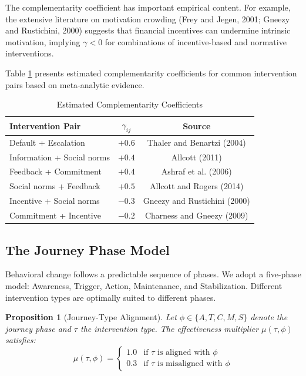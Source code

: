 \documentclass[12pt,a4paper]{article}
\newtheorem{proposition}{Proposition}
\begin{document}
The complementarity coefficient has important empirical content. For example, the extensive literature on motivation crowding (Frey and Jegen, 2001; Gneezy and Rustichini, 2000) suggests that financial incentives can undermine intrinsic motivation, implying $\gamma < 0$ for combinations of incentive-based and normative interventions.

Table \ref{tab:complementarity} presents estimated complementarity coefficients for common intervention pairs based on meta-analytic evidence.

\begin{table}[H]
\centering
\caption{Estimated Complementarity Coefficients}
\label{tab:complementarity}
\small
\renewcommand{\arraystretch}{1.2}
\begin{tabular}{@{}lcc@{}}
\toprule
\textbf{Intervention Pair} & \textbf{$\gamma_{ij}$} & \textbf{Source} \\
\midrule
Default + Escalation & $+0.6$ & Thaler and Benartzi (2004) \\
Information + Social norms & $+0.4$ & Allcott (2011) \\
Feedback + Commitment & $+0.4$ & Ashraf et al. (2006) \\
Social norms + Feedback & $+0.5$ & Allcott and Rogers (2014) \\
Incentive + Social norms & $-0.3$ & Gneezy and Rustichini (2000) \\
Commitment + Incentive & $-0.2$ & Charness and Gneezy (2009) \\
\bottomrule
\end{tabular}
\end{table}

\subsection{The Journey Phase Model}

Behavioral change follows a predictable sequence of phases. We adopt a five-phase model: Awareness, Trigger, Action, Maintenance, and Stabilization. Different intervention types are optimally suited to different phases.

\begin{proposition}[Journey-Type Alignment]
Let $\phi \in \{A, T, C, M, S\}$ denote the journey phase and $\tau$ the intervention type. The effectiveness multiplier $\mu(\tau, \phi)$ satisfies:
\begin{equation}
\mu(\tau, \phi) = \begin{cases}
1.0 & \text{if } \tau \text{ is aligned with } \phi \\
0.3 & \text{if } \tau \text{ is misaligned with } \phi
\end{cases}
\end{equation}
\end{proposition}
\end{document}
